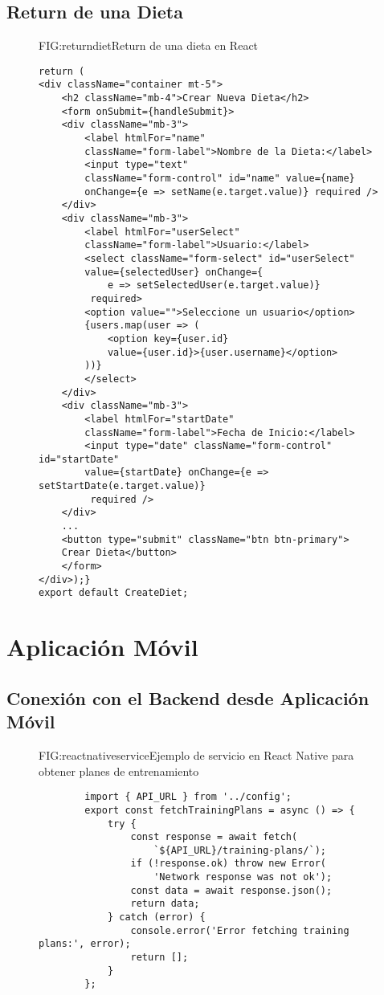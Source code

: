 \subsection{Return de una Dieta}
\begin{figure}[Return de Dieta]{FIG:returndiet}{Return de una dieta en React}
    \begin{verbatim}
return (
<div className="container mt-5">
    <h2 className="mb-4">Crear Nueva Dieta</h2>
    <form onSubmit={handleSubmit}>
    <div className="mb-3">
        <label htmlFor="name" 
        className="form-label">Nombre de la Dieta:</label>
        <input type="text" 
        className="form-control" id="name" value={name} 
        onChange={e => setName(e.target.value)} required />
    </div>
    <div className="mb-3">
        <label htmlFor="userSelect" 
        className="form-label">Usuario:</label>
        <select className="form-select" id="userSelect" 
        value={selectedUser} onChange={
            e => setSelectedUser(e.target.value)}
         required>
        <option value="">Seleccione un usuario</option>
        {users.map(user => (
            <option key={user.id} 
            value={user.id}>{user.username}</option>
        ))}
        </select>
    </div>
    <div className="mb-3">
        <label htmlFor="startDate" 
        className="form-label">Fecha de Inicio:</label>
        <input type="date" className="form-control" id="startDate" 
        value={startDate} onChange={e => setStartDate(e.target.value)}
         required />
    </div>
    ...
    <button type="submit" className="btn btn-primary">
    Crear Dieta</button>
    </form>
</div>);}
export default CreateDiet;
    \end{verbatim}
    \end{figure}


\newpage
\section{Aplicación Móvil}

\subsection{Conexión con el Backend desde Aplicación Móvil}
\begin{figure}[Ejemplo Servicio React Native]{FIG:reactnativeservice}{Ejemplo de servicio en React Native para obtener planes de entrenamiento}
    \begin{verbatim}
        import { API_URL } from '../config';
        export const fetchTrainingPlans = async () => {
            try {
                const response = await fetch(
                    `${API_URL}/training-plans/`);
                if (!response.ok) throw new Error(
                    'Network response was not ok');
                const data = await response.json();
                return data;
            } catch (error) {
                console.error('Error fetching training plans:', error);
                return [];
            }
        };
    \end{verbatim}
    \end{figure}

